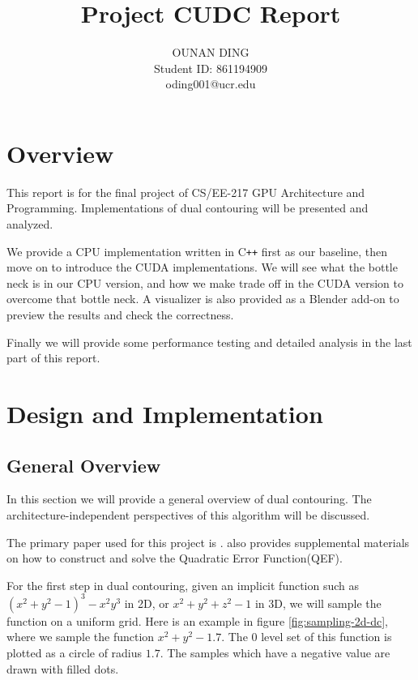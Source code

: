 \documentclass[a4paper,12pt]{article}
\title{Project CUDC Report}
\date{}
\author{
OUNAN DING\\
Student ID: 861194909\\
oding001@ucr.edu
}
\begin{document}
\maketitle{}

\tableofcontents{}

\section{Overview}

This report is for the final project of CS/EE-217 GPU Architecture
and Programming.
Implementations of dual contouring will be presented and analyzed.

We provide a CPU implementation written in C\texttt{++} first as our baseline,
then move on to introduce the CUDA implementations.
We will see what the bottle neck is in our CPU version,
and how we make trade off in the CUDA version to overcome that bottle neck.
A visualizer is also provided as a Blender add-on
to preview the results and check the correctness.

Finally we will provide some performance testing and detailed analysis
in the last part of this report.

\section{Design and Implementation}

\subsection{General Overview}

In this section we will provide a general overview of dual contouring.
The architecture-independent perspectives
of this algorithm will be discussed.

The primary paper used for this project is \cite{ju2002dual}.
\cite{schaefer2002dual} also provides supplemental materials
on how to construct and solve the Quadratic Error Function(QEF).

For the first step in dual contouring, given an implicit function
such as $(x^2 + y^2 - 1)^3 - x^2y^3$ in 2D, or $x^2 + y^2 + z^2 - 1$ in 3D,
we will sample the function on a uniform grid.
Here is an example in figure \ref{fig:sampling-2d-dc},
where we sample the function $x^2 + y^2 - 1.7$.
The $0$ level set of this function is plotted as a circle of radius $1.7$.
The samples which have a negative value are drawn with filled dots.
\end{document}

